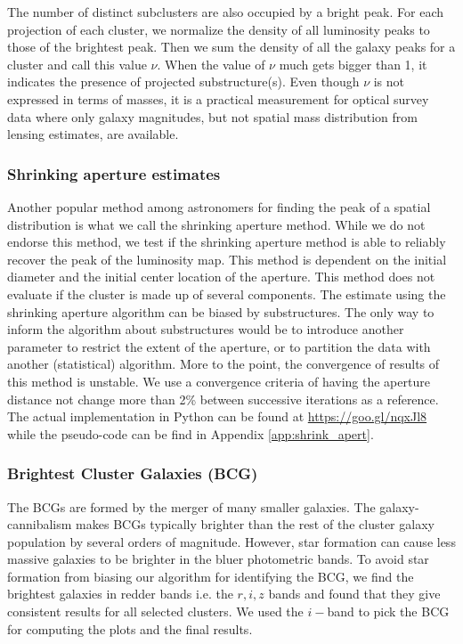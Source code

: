 The number of distinct subclusters are also occupied by a bright peak.
For each projection of each cluster, we normalize the density of all 
luminosity peaks to those of the brightest peak. 
Then we sum the density of all the galaxy peaks for a cluster and call this value
$\nu$. When the value of $\nu$ much gets bigger than 1, it indicates the presence 
of projected substructure(s). Even though 
$\nu$ is not expressed in terms of masses, it is a practical measurement
for optical survey data where only galaxy magnitudes, but not spatial mass distribution 
from lensing estimates, are available. 

\subsubsection{Shrinking aperture estimates}

Another popular method among astronomers for finding the peak of a spatial
distribution is what we call the shrinking aperture method.
While we do not endorse this method,
we test if the shrinking aperture method is able to reliably recover the 
peak of the luminosity map.
This method is dependent on the initial diameter and the initial center 
location of the aperture.
This method does not evaluate if the cluster is made up of
several components.
The estimate using the shrinking aperture algorithm can be biased by
substructures. The only way to inform the algorithm about substructures would
be to introduce another parameter to restrict the extent of the aperture, or to
partition the data with another (statistical) algorithm.
More to the point, the convergence of results of this method is unstable. We use a
convergence criteria of having the aperture distance not change more than 2\% 
between successive iterations as a reference. The actual implementation in
Python can be found at \href{https://goo.gl/nqxJl8}{https://goo.gl/nqxJl8} while
the pseudo-code can be find in Appendix \ref{app:shrink_apert}.

\subsubsection{Brightest Cluster Galaxies (BCG)}
The BCGs are formed by the merger of many smaller
galaxies. The galaxy-cannibalism makes BCGs typically brighter than the rest of 
the cluster galaxy population by several orders of magnitude. 
However, star formation can cause
less massive galaxies to be brighter in the bluer photometric bands.
To avoid star formation from biasing our algorithm for identifying the
BCG, we find the brightest galaxies in redder bands i.e. the $r, i, z$
bands and found that they give consistent results for all selected clusters. 
We used the $i-$band to pick the BCG for computing the plots and the final results. 
 
